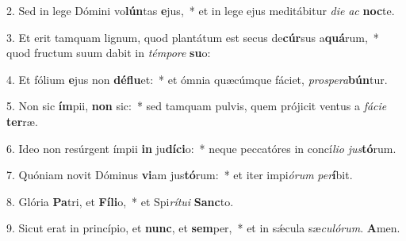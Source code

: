 2. Sed in lege Dómini vo\textbf{lún}tas \textbf{e}jus,~*  et in lege ejus meditábitur \textit{di}\textit{e} \textit{ac} \textbf{noc}te.\

3. Et erit tamquam lignum, quod plantátum est secus de\textbf{cúr}sus a\textbf{quá}rum,~*  quod fructum suum dabit in \textit{tém}\textit{po}\textit{re} \textbf{su}o:\

4. Et fólium \textbf{e}jus non \textbf{dé}\textbf{flu}et:~*  et ómnia quæcúmque fáciet, \textit{pro}\textit{spe}\textit{ra}\textbf{bún}tur.\

5. Non sic \textbf{ím}pii, \textbf{non} sic:~*  sed tamquam pulvis, quem prójicit ventus a \textit{fá}\textit{ci}\textit{e} \textbf{ter}ræ.\

6. Ideo non resúrgent ímpii \textbf{in} ju\textbf{dí}\textbf{ci}o:~*  neque peccatóres in concí\textit{li}\textit{o} \textit{jus}\textbf{tó}rum.\

7. Quóniam novit Dóminus \textbf{vi}am jus\textbf{tó}rum:~*  et iter impi\textit{ó}\textit{rum} \textit{per}\textbf{í}bit.\

8. Glória \textbf{Pa}tri, et \textbf{Fí}\textbf{li}o,~*  et Spi\textit{rí}\textit{tu}\textit{i} \textbf{Sanc}to.\

9. Sicut erat in princípio, et \textbf{nunc}, et \textbf{sem}per,~*  et in sǽcula sæ\textit{cu}\textit{ló}\textit{rum}. \textbf{A}men.\

